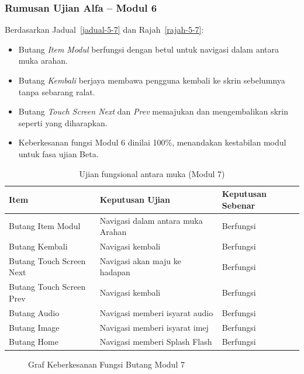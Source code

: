 {{\subsubsection{Rumusan Ujian Alfa – Modul 6}

Berdasarkan Jadual~\ref{jadual-5-7} dan Rajah~\ref{rajah-5-7}:

\begin{itemize}[h]
  \item Butang \textit{Item Modul} berfungsi dengan betul untuk navigasi dalam antara muka arahan.
  \item Butang \textit{Kembali} berjaya membawa pengguna kembali ke skrin sebelumnya tanpa sebarang ralat.
  \item Butang \textit{Touch Screen Next} dan \textit{Prev} memajukan dan mengembalikan skrin seperti yang diharapkan.
  \item Keberkesanan fungsi Modul 6 dinilai 100\%, menandakan kestabilan modul untuk fasa ujian Beta.
\end{itemize}
\clearpage
\begin{table}[H]
\centering
\caption{Ujian fungsional antara muka (Modul 7)}
\label{jadual-5-8}
\begin{tabular}{lll}
\toprule
\textbf{Item} & \textbf{Keputusan Ujian} & \textbf{Keputusan Sebenar} \\ \midrule
Butang Item Modul & Navigasi dalam antara muka Arahan & Berfungsi \\ 
Butang Kembali & Navigasi kembali & Berfungsi \\ 
Butang Touch Screen Next & Navigasi akan maju ke hadapan & Berfungsi \\ 
Butang Touch Screen Prev & Navigasi kembali & Berfungsi \\ 
Butang Audio & Navigasi memberi isyarat audio & Berfungsi \\ 
Butang Image & Navigasi memberi isyarat imej & Berfungsi \\ 
Butang Home & Navigasi memberi Splash Flash & Berfungsi \\ \bottomrule
\end{tabular}
\end{table}

\begin{figure}[h]
\centering
{}
\caption{Graf Keberkesanan Fungsi Butang Modul 7}
\label{rajah-5-8}
\end{figure}

}}
